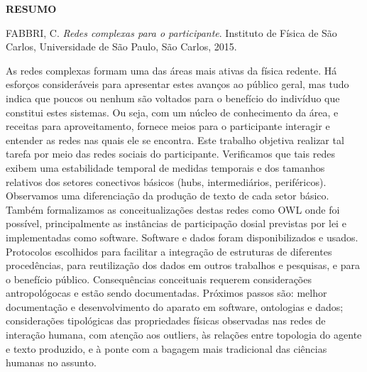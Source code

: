 \documentclass[a4paper,openright,12pt]{report} %
\begin{document}
\begin{singlespace}

\centerline{\LARGE{{\bf RESUMO}}}

\vspace*{1.5cm}

\hspace*{-0.9cm} FABBRI, C. \textit{Redes complexas para o participante}. 
Instituto de Física de São Carlos, Universidade de São Paulo, São Carlos, 2015. 

\vspace*{1.2cm}

\hspace*{-0.9cm}

{\noindent
	As redes complexas formam uma das áreas mais ativas da física redente.
	Há esforços consideráveis para apresentar estes avanços ao público geral, mas tudo indica
	que poucos ou nenhum são voltados para o benefício do indivíduo que constitui estes sistemas.
	Ou seja, com um núcleo de conhecimento da área, e receitas para aproveitamento,
	fornece meios para o participante interagir e entender as redes nas quais ele se encontra.
	Este trabalho objetiva realizar tal tarefa por meio das redes sociais do participante.
	Verificamos que tais redes exibem uma estabilidade temporal de medidas temporais e dos
	tamanhos relativos dos setores conectivos básicos (hubs, intermediários, periféricos).
	Observamos uma diferenciação da produção de texto de cada setor básico.
	Também formalizamos as conceitualizações destas redes como OWL onde foi possível,
	principalmente as instâncias de participação dosial previstas por lei e implementadas como software.
	Software e dados foram disponibilizados e usados. Protocolos escolhidos para
	facilitar a integração de estruturas de diferentes procedências,
	para reutilização dos dados em outros trabalhos e pesquisas, e para o benefício público.
	Consequências conceituais requerem considerações antropológocas e estão sendo documentadas.
	Próximos passos são: melhor documentação e desenvolvimento do aparato em software, ontologias e dados;
	considerações tipológicas das propriedades físicas observadas nas redes de interação humana, com
	atenção aos outliers, às relações entre topologia do agente e texto produzido, e à ponte com
	a bagagem mais tradicional das ciências humanas no assunto.
}


\end{singlespace}
\end{document}
